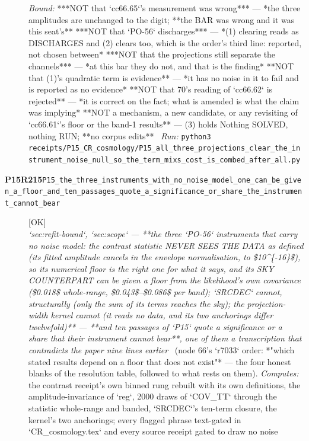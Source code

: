 \begin{description}
 \emph{Bound:}  ***NOT that `cc66.65`'s measurement was wrong*** --- *the three amplitudes are unchanged to the digit; **the BAR was wrong and it was this seat's** ***NOT that `PO-56` discharges*** --- *(1) clearing reads as DISCHARGES and (2) clears too, which is the order's third line: reported, not chosen between*  ***NOT that the projections still separate the channels*** --- *at this bar they do not, and that is the finding*  **NOT that (1)'s quadratic term is evidence** --- *it has no noise in it to fail and is reported as no evidence*  **NOT that 70's reading of `cc66.62` is rejected** --- *it is correct on the fact; what is amended is what the claim was implying*  **NOT a mechanism, a new candidate, or any revisiting of `cc66.61`'s floor or the band-1 results** --- (3) holds  Nothing SOLVED, nothing RUN; **no corpus edits**
\ \emph{Run:} \texttt{python3 receipts/P15\_CR\_cosmology/P15\_all\_three\_projections\_clear\_the\_instrument\_noise\_null\_so\_the\_term\_mixs\_cost\_is\_combed\_after\_all.py}
\item[\rcptlabel{P15_the_three_instruments_with_no_noise_model_one_can_be_given_a_floor_and_ten_passages_quote_a_significance_or_share_the_instrument_cannot_bear}{P15R215}\textbf{P15R215}\quad\texttt{P15\_the\_three\_instruments\_with\_no\_noise\_model\_one\_can\_be\_given\_a\_floor\_and\_ten\_passages\_quote\_a\_significance\_or\_share\_the\_instrument\_cannot\_bear}]\hfill\textsf{[OK]}\\
\textit{`sec:refit-bound`, `sec:scope` --- **the three `PO-56` instruments that carry no noise model: the contrast statistic NEVER SEES THE DATA as defined (its fitted amplitude cancels in the envelope normalisation, to \$10\textasciicircum{}\{-16\}\$), so its numerical floor is the right one for what it says, and its SKY COUNTERPART can be given a floor from the likelihood's own covariance (\$0.018\$ whole-range, \$0.043\$--\$0.086\$ per band); `SRCDEC` cannot, structurally (only the sum of its terms reaches the sky); the projection-width kernel cannot (it reads no data, and its two anchorings differ twelvefold)** --- **and ten passages of `P15` quote a significance or a share that their instrument cannot bear**, one of them a transcription that contradicts the paper nine lines earlier} \ (node 66's `r7033` order: *"which stated results depend on a floor that does not exist"* --- the four honest blanks of the resolution table, followed to what rests on them). 
\emph{Computes:} the contrast receipt's own binned rung rebuilt with its own definitions, the amplitude-invariance of `reg`, 2000 draws of `COV\_TT` through the statistic whole-range and banded, `SRCDEC`'s ten-term closure, the kernel's two anchorings; every flagged phrase text-gated in `CR\_cosmology.tex` and every source receipt gated to draw no noise

\end{description}
